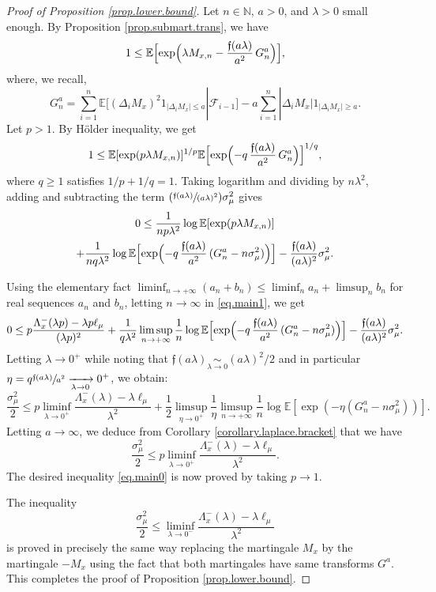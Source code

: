 \documentclass[JEP,XML,SOM,Unicode,published]{cedram}
\newcommand{\Psfrac}[2]{(\sfrac{#1}{#2})}
\theoremstyle{plain}
\theoremstyle{definition}
\newcommand\E{\mathbb{E}}
\newcommand\N{\mathbb{N}}
\begin{document}
\begin{proof}[Proof of Proposition \ref{prop.lower.bound}]
Let $n\in \N$, $a>0$, and $\lambda>0$ small enough. By Proposition \ref{prop.submart.trans}, we have
\[
1\leq \E\Bigl[\exp\Bigl(\lambda M_{x,n} - \frac{\mathfrak{f}(a\lambda)}{a^2}\, G_n^a\Bigr)\Bigr],
\]
where, we recall,
\[
G_n^a=\sum_{i=1}^n \mathbb{E}[(\Delta_i M_x)^2 1_{|\Delta_i M_x| \leq a}| \mathcal{F}_{i-1}]-a\sum_{i=1}^n |\Delta_iM_x| 1_{|\Delta_i M_x| \geq a}.
\]
Let $p> 1$. By Hölder inequality, we get
\[
1\leq
\E[\exp(p\lambda M_{x,n})]^{1/p}
\E\Bigl[\exp\Bigl(- q\,\frac{\mathfrak{f}(a\lambda)}{a^2}\,G_n^a\Bigr)\Bigr]^{1/q},
\]
where $q \geq 1$ satisfies $1/p+1/q=1$.
Taking logarithm and dividing by $n\lambda^2$, adding and subtracting the term $\Psfrac{\mathfrak{f}(a\lambda)}{(a\lambda)^2}\sigma_{\mu}^2$ gives
\begin{multline}\label{eq.main1}
0\leq \frac{1}{n p \lambda^2}\log \E[\exp(p\lambda M_{x,n})]\\
+ \frac{1}{nq \lambda^2}\log \E\Bigl[\exp\Bigl(- q\,\frac{\mathfrak{f}(a\lambda)}{a^2}\, (G_n^a-n\sigma_{\mu}^2)\Bigr)\Bigr]-\frac{\mathfrak{f}(a\lambda)}{(a\lambda)^2}\sigma_{\mu}^2.
\end{multline}

Using the elementary fact $\liminf_{n\to +\infty}(a_n+b_n)\leq \liminf_n a_n + \limsup_n b_n$ for real sequences $a_n$ and $b_n$, letting $n \to \infty$ in \eqref{eq.main1}, we get
\[
0\leq p \frac{\Lambda_x^-(\lambda p)- \lambda p\ell_{\mu}}{(\lambda p)^2} + \frac{1}{ q\lambda^2}\limsup_{n\to +\infty} \frac{1}{n}\log \E\Bigl[\exp\Bigl(- q\,\frac{\mathfrak{f}(a\lambda)}{a^2}\, (G_n^a-n\sigma_{\mu}^2)\Bigr)\Bigr]- \frac{\mathfrak{f}(a\lambda)}{(a\lambda)^2}\sigma_{\mu}^2.
\]
Letting $\lambda\to 0^+$ while noting that $\mathfrak{f}(a\lambda) \underset{\lambda\to 0}{\sim} (a\lambda)^2/2$ and in particular $\eta=q\sfrac{\mathfrak{f}(a\lambda)}{a^2}\allowbreak \xrightarrow[\lambda \to 0]{} 0^+$, we obtain:
\[
\frac{\sigma_{\mu}^2}{2}\leq p \liminf_{\lambda\to 0^+}{\frac{\Lambda_x^-(\lambda)-\lambda \ell_{\mu}}{\lambda^2}}
+ \frac{1}{2}\limsup_{\eta\to 0^+}\frac{1}{\eta}
\limsup_{n\to +\infty}\frac{1}{n}\log\E[\exp(-\eta (G_n^a-n\sigma_{\mu}^2))].
\]
Letting $a \to \infty$, we deduce from Corollary \ref{corollary.laplace.bracket} that we have
\[
\frac{\sigma_\mu^2}{2} \leq p \liminf_{\lambda\to 0^+}{\frac{\Lambda_x^-(\lambda)-\lambda \ell_{\mu}}{\lambda^2}}.
\]
The desired inequality \eqref{eq.main0} is now proved by taking $p \to 1$.

The inequality
\begin{equation}\label{eq.main}
\frac{\sigma_{\mu}^2}{2}\leq \liminf_{\lambda\to 0^-}{\frac{\Lambda_x^-(\lambda)-\lambda \ell_{\mu}}{\lambda^2}}\end{equation}
is proved in precisely the same way replacing the martingale $M_{x}$ by the martingale $-M_{x}$ using the fact that both martingales have same transforms $G^a$. This completes the proof of Proposition \ref{prop.lower.bound}.
\end{proof}
\end{document}
